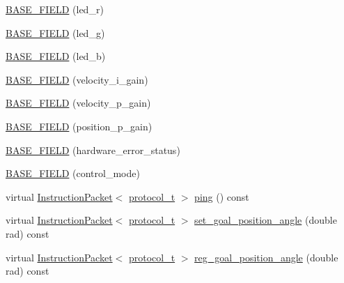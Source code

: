 \begin{DoxyCompactItemize}
\hyperlink{classdynamixel_1_1servos_1_1_base_servo_a2675879e1916600b4251a8798dda7792}{B\+A\+S\+E\+\_\+\+F\+I\+E\+L\+D} (led\+\_\+r)
\item 
\hyperlink{classdynamixel_1_1servos_1_1_base_servo_ad004618d6add77d2a3599dfe0a9b8be2}{B\+A\+S\+E\+\_\+\+F\+I\+E\+L\+D} (led\+\_\+g)
\item 
\hyperlink{classdynamixel_1_1servos_1_1_base_servo_afbf232f99d9b318714936dd12fd71474}{B\+A\+S\+E\+\_\+\+F\+I\+E\+L\+D} (led\+\_\+b)
\item 
\hyperlink{classdynamixel_1_1servos_1_1_base_servo_a87e0bff5c474582d9bbd1ffe45f91da5}{B\+A\+S\+E\+\_\+\+F\+I\+E\+L\+D} (velocity\+\_\+i\+\_\+gain)
\item 
\hyperlink{classdynamixel_1_1servos_1_1_base_servo_a3ecd90f9f9c23eefeb298508ce7d26d9}{B\+A\+S\+E\+\_\+\+F\+I\+E\+L\+D} (velocity\+\_\+p\+\_\+gain)
\item 
\hyperlink{classdynamixel_1_1servos_1_1_base_servo_a0aa14b2dc61dafdb0e1e238a37e57083}{B\+A\+S\+E\+\_\+\+F\+I\+E\+L\+D} (position\+\_\+p\+\_\+gain)
\item 
\hyperlink{classdynamixel_1_1servos_1_1_base_servo_a8a5b6f0cccde10173a942d1da92a4064}{B\+A\+S\+E\+\_\+\+F\+I\+E\+L\+D} (hardware\+\_\+error\+\_\+status)
\item 
\hyperlink{classdynamixel_1_1servos_1_1_base_servo_ad9fe76845a8b139921b35b7d346480e1}{B\+A\+S\+E\+\_\+\+F\+I\+E\+L\+D} (control\+\_\+mode)
\item 
virtual \hyperlink{classdynamixel_1_1_instruction_packet}{Instruction\+Packet}$<$ \hyperlink{classdynamixel_1_1servos_1_1_base_servo_ac484c11279ee2576a9a3bb8c940e0baf}{protocol\+\_\+t} $>$ \hyperlink{classdynamixel_1_1servos_1_1_base_servo_adae0a44afbebfb03343d325648387301}{ping} () const 
\item 
virtual \hyperlink{classdynamixel_1_1_instruction_packet}{Instruction\+Packet}$<$ \hyperlink{classdynamixel_1_1servos_1_1_base_servo_ac484c11279ee2576a9a3bb8c940e0baf}{protocol\+\_\+t} $>$ \hyperlink{classdynamixel_1_1servos_1_1_base_servo_ac91b383ed4ba24ccc142fe6cb08479fe}{set\+\_\+goal\+\_\+position\+\_\+angle} (double rad) const 
\item 
virtual \hyperlink{classdynamixel_1_1_instruction_packet}{Instruction\+Packet}$<$ \hyperlink{classdynamixel_1_1servos_1_1_base_servo_ac484c11279ee2576a9a3bb8c940e0baf}{protocol\+\_\+t} $>$ \hyperlink{classdynamixel_1_1servos_1_1_base_servo_a5912ce58f8d174bcccd07ef75fef6a6b}{reg\+\_\+goal\+\_\+position\+\_\+angle} (double rad) const 
\item 

\end{DoxyCompactItemize}
